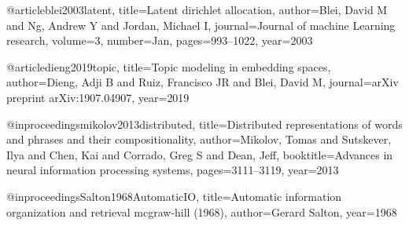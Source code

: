 @article{blei2003latent,
  title={Latent dirichlet allocation},
  author={Blei, David M and Ng, Andrew Y and Jordan, Michael I},
  journal={Journal of machine Learning research},
  volume={3},
  number={Jan},
  pages={993--1022},
  year={2003}
}

@article{dieng2019topic,
  title={Topic modeling in embedding spaces},
  author={Dieng, Adji B and Ruiz, Francisco JR and Blei, David M},
  journal={arXiv preprint arXiv:1907.04907},
  year={2019}
}

@inproceedings{mikolov2013distributed,
  title={Distributed representations of words and phrases and their compositionality},
  author={Mikolov, Tomas and Sutskever, Ilya and Chen, Kai and Corrado, Greg S and Dean, Jeff},
  booktitle={Advances in neural information processing systems},
  pages={3111--3119},
  year={2013}
}

@inproceedings{Salton1968AutomaticIO,
  title={Automatic information organization and retrieval mcgraw-hill (1968)},
  author={Gerard Salton},
  year={1968}
}

